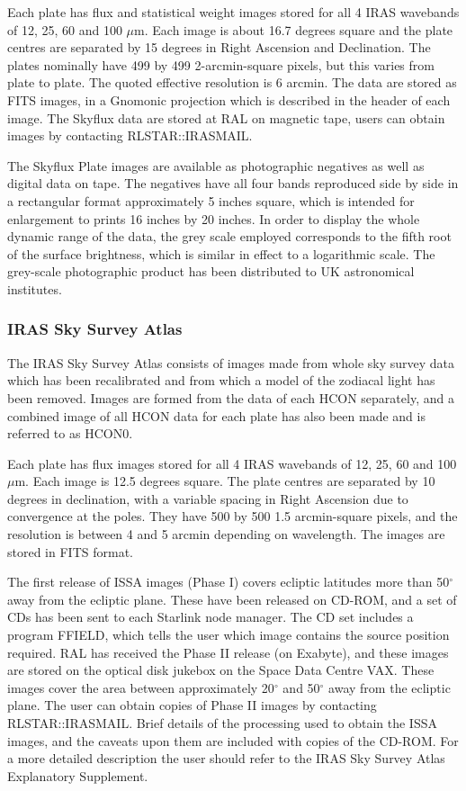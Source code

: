 Each plate has flux and statistical weight images stored for all 4 IRAS
wavebands of 12, 25, 60 and 100 $\mu$m.
Each image is about 16.7 degrees square and the plate centres are separated by 
15 degrees in Right Ascension and Declination. The plates nominally have
499 by 499 2-arcmin-square pixels, but this varies from plate to plate.
The quoted effective resolution is 6 arcmin.
The data are stored as FITS images, in a Gnomonic projection which is 
described in the header of each image.
The Skyflux data are stored at RAL on magnetic tape, users can obtain 
images by contacting RLSTAR::IRASMAIL.

The Skyflux Plate images are available as photographic negatives as well as 
digital data on tape.
The negatives have all four bands reproduced side by side in a rectangular 
format approximately 5 inches square, which is intended for enlargement to 
prints 16 inches by 20 inches.
In order to display the whole dynamic range of the data, the grey scale employed
corresponds to the fifth root of the surface brightness, which is similar in
effect to a logarithmic scale.
The grey-scale photographic product has been distributed to UK astronomical
institutes.

\subsubsection{IRAS Sky Survey Atlas}
The IRAS Sky Survey Atlas consists of images made from whole sky survey data
which has been recalibrated and from which a model of the zodiacal light has 
been removed.
Images are formed from the data of each HCON separately, and a combined image
of all HCON data for each plate has also been made and is referred to as HCON0.

Each plate has flux images stored for all 4 IRAS wavebands of 12, 25, 60 and
100 $\mu$m.
Each image is 12.5 degrees square. The plate centres are separated by 10 degrees
in declination, with a variable spacing in Right Ascension due to convergence at
the poles. They have 500 by 500 1.5 arcmin-square pixels, and the resolution is
between 4 and 5 arcmin depending on wavelength.
The images are stored in FITS format. 

The first release of ISSA images (Phase I) covers ecliptic latitudes more than 
50$^{\circ}$ away from the ecliptic plane. These have been released on CD-ROM,
and a set of CDs has been sent to each Starlink node manager.
The CD set includes a program FFIELD, which tells the user which image 
contains the source position required.
RAL has received the Phase II release (on Exabyte), and these images are stored
on the optical disk jukebox on the Space Data Centre VAX. These images cover 
the area between approximately 20$^{\circ}$ and 50$^{\circ}$ away from the 
ecliptic plane. 
The user can obtain copies of Phase II images by contacting RLSTAR::IRASMAIL.
Brief details of
the processing used to obtain the ISSA images, and the caveats upon them are
included with copies of the CD-ROM. For a more detailed description the user
should refer to the IRAS Sky Survey Atlas Explanatory Supplement.

